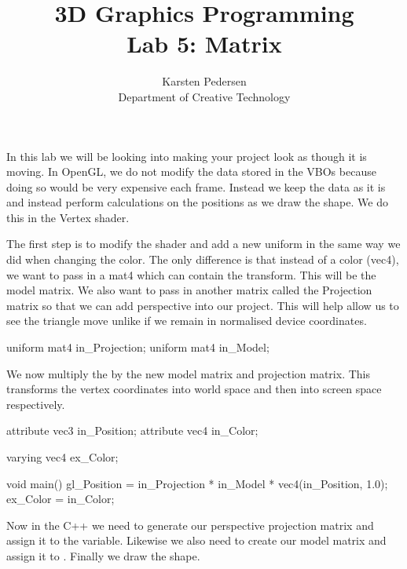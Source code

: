 \documentclass[10pt]{article}
\begin{document}
\title{3D Graphics Programming \\
  \large Lab 5: Matrix}

\author{Karsten Pedersen\\ Department of Creative Technology}
\maketitle

In this lab we will be looking into making your project look as though
it is moving.  In OpenGL, we do not modify the data stored in the VBOs
because doing so would be very expensive each frame. Instead we keep
the data as it is and instead perform calculations on the positions as
we draw the shape.  We do this in the Vertex shader.

The first step is to modify the shader and add a new uniform in the
same way we did when changing the color. The only difference is that
instead of a color (vec4), we want to pass in a mat4 which can contain
the transform.  This will be the model matrix. We also want to pass in
another matrix called the Projection matrix so that we can add perspective
into our project. This will help allow us to see the triangle move unlike
if we remain in normalised device coordinates.

\begin{Code}

uniform mat4 in_Projection;
uniform mat4 in_Model;

\end{Code}

We now multiply the  by the new model matrix and projection
matrix.  This transforms the vertex coordinates into world space and
then into screen space respectively.

\begin{Code}

attribute vec3 in_Position;
attribute vec4 in_Color;

varying vec4 ex_Color;

void main()
{
  gl_Position = in_Projection * in_Model * vec4(in_Position, 1.0);
  ex_Color = in_Color;
}

\end{Code}

Now in the C++ we need to generate our perspective projection matrix
and assign it to the  variable.  Likewise we also need to
create our model matrix and assign it to . Finally we draw the shape.
\end{document}
